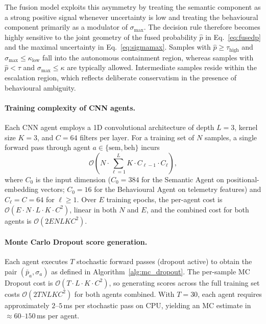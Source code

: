 \documentclass[3p]{elsarticle}
\begin{document}
The fusion model exploits this asymmetry by treating the semantic component as a strong positive signal whenever uncertainty is low and treating the behavioural component primarily as a modulator of \(\sigma_{\max}\). The decision rule therefore becomes highly sensitive to the joint geometry of the fused probability \(\hat{p}\) in Eq.~\eqref{eq:fusedp} and the maximal uncertainty in Eq.~\eqref{eq:sigmamax}. Samples with \(\hat{p} \ge \tau_{\mathrm{high}}\) and \(\sigma_{\max} \le \kappa_{\mathrm{low}}\) fall into the autonomous containment region, whereas samples with \(\hat{p} < \tau\) and \(\sigma_{\max} \le \kappa\) are typically allowed. Intermediate samples reside within the escalation region, which reflects deliberate conservatism in the presence of behavioural ambiguity.

\begin{changedblock}
\paragraph{Training complexity of CNN agents.}
Each CNN agent employs a 1D convolutional architecture of depth $L=3$, kernel size $K=3$,
and $C=64$ filters per layer.
For a training set of $N$ samples, a single forward pass through agent
$a \in \{\mathrm{sem}, \mathrm{beh}\}$ incurs
\begin{equation}
  \mathcal{O}\!\left(N \cdot \sum_{\ell=1}^{L} K \cdot C_{\ell-1} \cdot C_{\ell}\right),
  \label{eq:cnn_fwd}
\end{equation}
where $C_0$ is the input dimension ($C_0 = 384$ for the Semantic Agent on positional-embedding
vectors; $C_0 = 16$ for the Behavioural Agent on telemetry features) and $C_\ell = C = 64$
for $\ell \ge 1$.
Over $E$ training epochs, the per-agent cost is
$\mathcal{O}(E \cdot N \cdot L \cdot K \cdot C^2)$, linear in both $N$ and $E$,
and the combined cost for both agents is $\mathcal{O}(2 E N L K C^2)$.

\paragraph{Monte Carlo Dropout score generation.}
Each agent executes $T$ stochastic forward passes (dropout active) to obtain the pair
$(\bar{p}_a, \sigma_a)$ as defined in Algorithm~\ref{alg:mc_dropout}.
The per-sample MC Dropout cost is $\mathcal{O}(T \cdot L \cdot K \cdot C^2)$, so generating
scores across the full training set costs $\mathcal{O}(2 T N L K C^2)$ for both agents
combined.
With $T = 30$, each agent requires approximately $2$--$5$\,ms per stochastic pass on CPU,
yielding an MC estimate in $\approx 60$--$150$\,ms per agent.


\end{changedblock}
\end{document}

